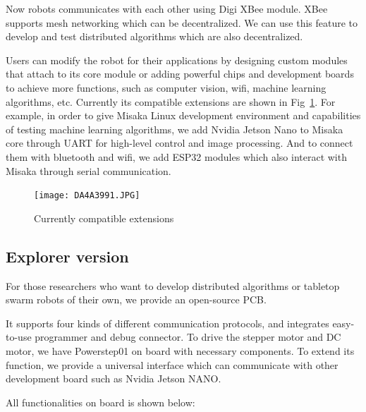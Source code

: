 \documentclass[sigconf]{acmart}
\begin{document}
Now robots communicates with each other using Digi XBee module. XBee supports mesh networking which can be decentralized. We can use this feature to develop and test distributed algorithms which are also decentralized.

Users can modify the robot for their applications by designing custom modules that attach to its core module or adding powerful chips and development boards to achieve more functions, such as computer vision, wifi, machine learning algorithms, etc. Currently its compatible extensions are shown in Fig~\ref{fig:extensions}. For example, in order to give Misaka Linux development environment and capabilities of testing machine learning algorithms, we add Nvidia Jetson Nano to Misaka core through UART for high-level control and image processing. And to connect them with bluetooth and wifi, we add ESP32 modules which also interact with Misaka through serial communication.\cite{zhang2020misaka}

\begin{figure}[h]
  \centering
  \texttt{[image: DA4A3991.JPG]}
  \caption{Currently compatible extensions}
  \label{fig:extensions}
\end{figure}

\subsection{Explorer version}

For those researchers who want to develop distributed algorithms or tabletop swarm robots of their own, we provide an open-source PCB. 

It supports four kinds of different communication protocols, and integrates easy-to-use programmer and debug connector. To drive the stepper motor and DC motor, we have Powerstep01 on board with necessary components.
To extend its function, we provide a universal interface which can communicate with other development board such as Nvidia Jetson NANO.

All functionalities on board is shown below:
\end{document}
